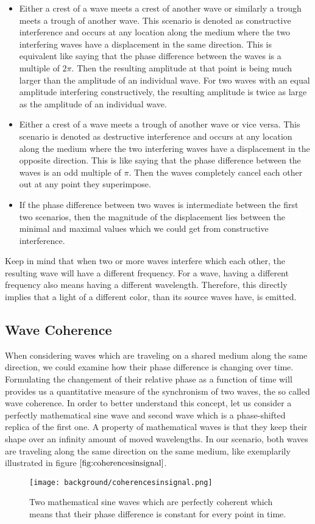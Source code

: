 \begin{itemize}
  \item Either a crest of a wave meets a crest of another wave or similarly a trough meets a trough of another wave. This scenario is denoted as constructive interference and occurs at any location along the medium where the two interfering waves have a displacement in the same direction. This is equivalent like saying that the phase difference between the waves is a multiple of $2\pi$. Then the resulting amplitude at that point is being much larger than the amplitude of an individual wave. For two waves with an equal amplitude interfering constructively, the resulting amplitude is twice as large as the amplitude of an individual wave.
  \item Either a crest of a wave meets a trough of another wave or vice versa. This scenario is denoted as destructive interference and occurs at any location along the medium where the two interfering waves have a displacement in the opposite direction. This is like saying that the phase difference between the waves is an odd multiple of $\pi$. Then the waves completely cancel each other out at any point they superimpose.
  \item If the phase difference between two waves is intermediate between the first two scenarios, then the magnitude of the displacement lies between the minimal and maximal values which we could get from constructive interference.
\end{itemize}
Keep in mind that when two or more waves interfere which each other, the resulting wave will have a different frequency. For a wave, having a different frequency also means having a different wavelength. Therefore, this directly implies that a light of a different color, than its source waves have, is emitted. 

\subsection{Wave Coherence}
When considering waves which are traveling on a shared medium along the same direction, we could examine how their phase difference is changing over time. Formulating the changement of their relative phase as a function of time will provides us a quantitative measure of the synchronism of two waves, the so called wave coherence. In order to better understand this concept, let us consider a perfectly mathematical sine wave and second wave which is a phase-shifted replica of the first one. A property of mathematical waves is that they keep their shape over an infinity amount of moved wavelengths. In our scenario, both waves are traveling along the same direction on the same medium, like exemplarily illustrated in figure $\ref{fig:coherencesinsignal}$.
\begin{figure}[H]
  \centering
  \texttt{[image: background/coherencesinsignal.png]}
  \caption{Two mathematical sine waves which are perfectly coherent which means that their phase difference is constant for every point in time.}
  \label{fig:coherencesinsignal}
\end{figure}

